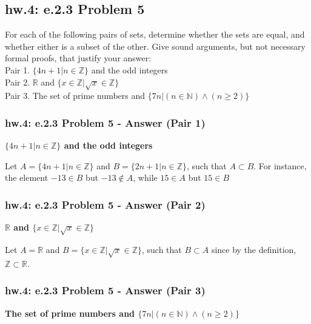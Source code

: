 \subsection{hw.4: e.2.3 Problem 5}
For each of the following pairs of sets, determine whether  the sets are equal, and whether either is a subset of the other. Give sound arguments, but not necessary formal proofs, that justify your answer: \\
Pair 1. $ \{ 4n + 1 | n \in \mathbb{Z} \}$ and the odd integers \\
Pair 2. $\mathbb{R}$ and $ \{ x \in \mathbb{Z} | \sqrt{x} \in \mathbb{Z} \}$ \\
Pair 3. The set of prime numbers and $ \{ 7n | (n \in \mathbb{N}) \wedge (n \geqslant 2) \}$


\subsubsection*{hw.4: e.2.3 Problem 5 - Answer (Pair 1)}

\begin{center}
{\bf $ \{ 4n + 1 | n \in \mathbb{Z} \}$ and the odd integers}
\end{center}

Let  $ A = \{ 4n + 1 | n \in \mathbb{Z} \}$ and $ B = \{ 2n + 1 | n \in \mathbb{Z} \}$, such that $A \subset B$. For instance, the element $-13 \in B$ but $-13 \notin A$, while $15 \in A$ but $15 \in B$



\subsubsection*{hw.4: e.2.3 Problem 5 - Answer (Pair 2)}

\begin{center}
{\bf $\mathbb{R}$ and $ \{ x \in \mathbb{Z} | \sqrt{x} \in \mathbb{Z} \}$}
\end{center}

Let  $ A = \mathbb{R}$ and $ B =  \{ x \in \mathbb{Z} | \sqrt{x} \in \mathbb{Z} \}$, such that $B \subset A$ since by the definition, $\mathbb{Z} \subset \mathbb{R}$. 



\subsubsection*{hw.4: e.2.3 Problem 5 - Answer (Pair 3)}

\begin{center}
{\bf The set of prime numbers and $ \{ 7n | (n \in \mathbb{N}) \wedge (n \geqslant 2) \}$}
\end{center}

